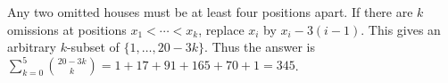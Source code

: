 Any two omitted houses must be at least four positions apart. If there are $k$ omissions at positions $x_1<\cdots<x_k$, replace $x_i$ by $x_i-3(i-1)$. This gives an arbitrary $k$-subset of $\{1,\ldots,20-3k\}$. Thus the answer is $\sum_{k=0}^{5}\binom{20-3k}{k}=1+17+91+165+70+1=\boxed{345}$.

